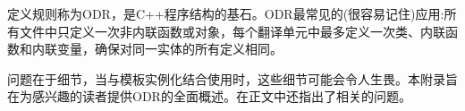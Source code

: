 定义规则称为ODR，是C++程序结构的基石。ODR最常见的(很容易记住)应用:所有文件中只定义一次非内联函数或对象，每个翻译单元中最多定义一次类、内联函数和内联变量，确保对同一实体的所有定义相同。

问题在于细节，当与模板实例化结合使用时，这些细节可能会令人生畏。本附录旨在为感兴趣的读者提供ODR的全面概述。在正文中还指出了相关的问题。
















































